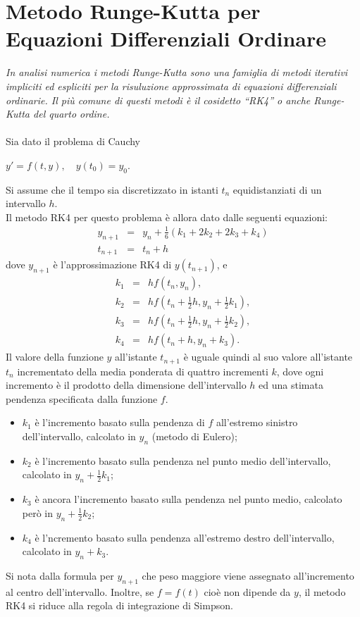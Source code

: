 \documentclass[a4paper,11pt]{report}
\begin{document}
\chapter{\huge Metodo Runge-Kutta per Equazioni Differenziali Ordinare}
\textit{In analisi numerica i metodi Runge-Kutta sono una famiglia di metodi iterativi impliciti ed espliciti per la risuluzione approssimata di equazioni differenziali ordinarie. Il più comune di questi metodi è il cosidetto ``RK4'' o anche Runge-Kutta del quarto ordine.}
\\\\
Sia dato il problema di Cauchy
\begin{center}
$ y' = f(t, y), \quad y(t_0) = y_0.$
\end{center}
Si assume che il tempo sia discretizzato in istanti $t_n$ equidistanziati di un intervallo $h$.\\
Il metodo RK4 per questo problema è allora dato dalle seguenti equazioni:
\begin{eqnarray*}
y_{n+1} &=& y_n + \tfrac{1}{6} \left(k_1 + 2k_2 + 2k_3 + k_4 \right)\\
t_{n+1} &=& t_n + h
\end{eqnarray*}
dove $y_{n+1}$ è l'approssimazione RK4 di $y(t_{n+1})$, e
\begin{eqnarray*}
k_1 &=& hf(t_n, y_n),\\
k_2 &=& hf(t_n + \tfrac{1}{2}h , y_n + \tfrac{1}{2} k_1),\\
k_3 &=& hf(t_n + \tfrac{1}{2}h , y_n + \tfrac{1}{2} k_2),\\
k_4 &=& hf(t_n + h , y_n + k_3).
\end{eqnarray*}
Il valore della funzione $y$ all'istante $t_{n+1}$ è uguale quindi al suo valore all'istante $t_n$ incrementato della media ponderata di quattro incrementi $k$, dove ogni incremento è il prodotto della dimensione dell'intervallo $h$ ed una stimata pendenza specificata dalla funzione $f$.
\begin{itemize}
\item $k_1$ è l'incremento basato sulla pendenza di $f$ all'estremo sinistro dell'intervallo, calcolato in $y_n$ (metodo di Eulero);
\item $k_2$ è l'incremento basato sulla pendenza nel punto medio dell'intervallo, calcolato in $y_n+\frac{1}{2}k_1$;
\item $k_3$ è ancora l'incremento basato sulla pendenza nel punto medio, calcolato però in $y_n+\frac{1}{2}k_2$;
\item $k_4$ è l'ncremento basato sulla pendenza all'estremo destro dell'intervallo, calcolato in $y_n+k_3$.
\end{itemize}
Si nota dalla formula per $y_{n+1}$ che peso maggiore viene assegnato all'incremento al centro dell'intervallo. Inoltre, se $f=f(t)$ cioè non dipende da $y$, il metodo RK4 si riduce alla regola di integrazione di Simpson.
\end{document}
